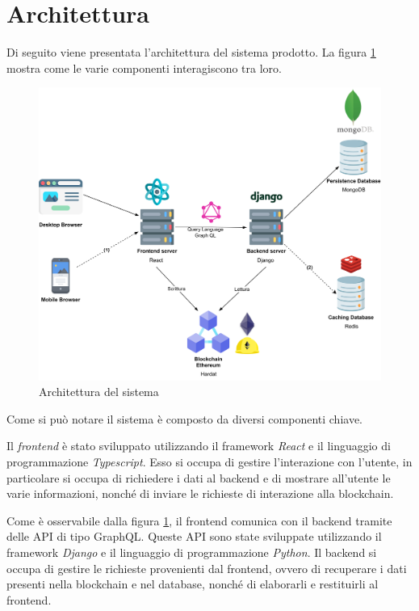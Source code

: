 \section{Architettura}
\label{sec:architettura}

Di seguito viene presentata l'architettura del sistema prodotto. La figura \ref{fig:architettura} mostra come le varie componenti interagiscono tra loro.

\begin{figure}[H]
    \centering
    \includegraphics[width=1.0\textwidth]{images/infrastruttura}
    \caption{Architettura del sistema}
    \label{fig:architettura}
\end{figure}

Come si può notare il sistema è composto da diversi componenti chiave. 

Il \textit{frontend} è stato sviluppato utilizzando il framework \textit{React} e il linguaggio di programmazione \textit{Typescript}. Esso si occupa di gestire l'interazione con l'utente, in particolare si occupa di richiedere i dati al backend e di mostrare all'utente le varie informazioni, nonché di inviare le richieste di interazione alla blockchain.

Come è osservabile dalla figura \ref{fig:architettura}, il frontend comunica con il backend tramite delle API di tipo GraphQL. Queste API sono state sviluppate utilizzando il framework \textit{Django} e il linguaggio di programmazione \textit{Python}. Il backend si occupa di gestire le richieste provenienti dal frontend, ovvero di recuperare i dati presenti nella blockchain e nel database, nonché di elaborarli e restituirli al frontend.

